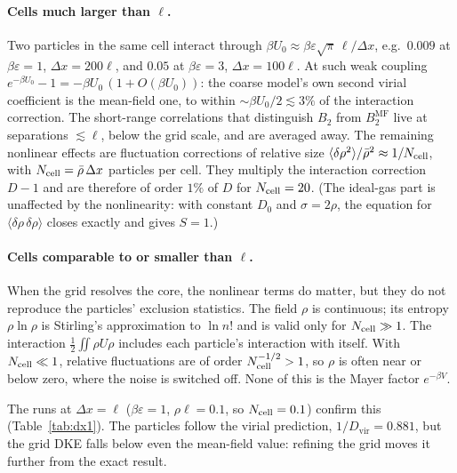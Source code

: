 \documentclass[11pt]{article}
\newcommand{\MF}{\mathrm{MF}}
\newcommand{\vir}{\mathrm{vir}}
\begin{document}
\paragraph{Cells much larger than $\ell$.} Two particles in the same cell
interact through $\beta U_0 \approx \beta\varepsilon\sqrt\pi\,\ell/\Delta x$,
e.g.\ $0.009$ at $\beta\varepsilon=1$, $\Delta x=200\ell$, and $0.05$ at
$\beta\varepsilon=3$, $\Delta x=100\ell$. At such weak coupling
$e^{-\beta U_0}-1 = -\beta U_0\,(1+O(\beta U_0))$: the coarse model's own
second virial coefficient is the mean-field one, to within
$\sim\beta U_0/2\lesssim 3\%$ of the interaction correction. The
short-range correlations that distinguish $B_2$ from $B_2^\MF$ live at
separations $\lesssim\ell$, below the grid scale, and are averaged away. The
remaining nonlinear effects are fluctuation corrections of relative size
$\langle\delta\rho^2\rangle/\bar\rho^2 \approx 1/N_{\rm cell}$, with
$N_{\rm cell}=\bar\rho\,\Delta x$ particles per cell. They multiply the
interaction correction $D-1$ and are therefore of order $1\%$ of $D$ for
$N_{\rm cell}=20$. (The ideal-gas part is unaffected by the nonlinearity: with
constant $D_0$ and $\sigma=2\rho$, the equation for
$\langle\delta\rho\,\delta\rho\rangle$ closes exactly and gives $S=1$.)

\paragraph{Cells comparable to or smaller than $\ell$.} When the grid resolves
the core, the nonlinear terms do matter, but they do not reproduce the
particles' exclusion statistics. The field $\rho$ is continuous; its entropy
$\rho\ln\rho$ is Stirling's approximation to $\ln n!$ and is valid only for
$N_{\rm cell}\gg1$. The interaction $\tfrac12\iint\rho U\rho$ includes each
particle's interaction with itself. With $N_{\rm cell}\ll1$, relative
fluctuations are of order $N_{\rm cell}^{-1/2}>1$, so $\rho$ is often near or
below zero, where the noise is switched off. None of this is the Mayer factor
$e^{-\beta V}$.

The runs at $\Delta x=\ell$ ($\beta\varepsilon=1$, $\rho\ell=0.1$, so
$N_{\rm cell}=0.1$) confirm this (Table~\ref{tab:dx1}). The particles follow
the virial prediction, $1/D_\vir=0.881$, but the grid DKE falls below even the
mean-field value: refining the grid moves it further from the exact result.
\end{document}
